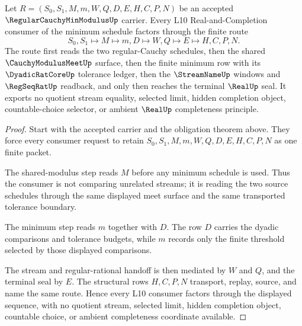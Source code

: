 \begin{theorem}\label{thm:regular-cauchy-min-modulus-l10-route}
Let $R=(S_0,S_1,M,m,W,Q,D,E,H,C,P,N)$ be an accepted $\RegularCauchyMinModulusUp$ carrier. Every L10 Real-and-Completion consumer of the minimum schedule factors through the finite route
$$
S_0,S_1 \longmapsto M \longmapsto m,D \longmapsto W,Q \longmapsto E \longmapsto H,C,P,N .
$$
The route first reads the two regular-Cauchy schedules, then the shared $\CauchyModulusMeetUp$ surface, then the finite minimum row with its $\DyadicRatCoreUp$ tolerance ledger, then the $\StreamNameUp$ windows and $\RegSeqRatUp$ readback, and only then reaches the terminal $\RealUp$ seal. It exports no quotient stream equality, selected limit, hidden completion object, countable-choice selector, or ambient $\RealUp$ completeness principle.
\end{theorem}
\begin{proof}
Start with the accepted carrier and the obligation theorem above. They force every consumer request to retain $S_0,S_1,M,m,W,Q,D,E,H,C,P,N$ as one finite packet.

The shared-modulus step reads $M$ before any minimum schedule is used. Thus the consumer is not comparing unrelated streams; it is reading the two source schedules through the same displayed meet surface and the same transported tolerance boundary.

The minimum step reads $m$ together with $D$. The row $D$ carries the dyadic comparisons and tolerance budgets, while $m$ records only the finite threshold selected by those displayed comparisons.

The stream and regular-rational handoff is then mediated by $W$ and $Q$, and the terminal seal by $E$. The structural rows $H,C,P,N$ transport, replay, source, and name the same route. Hence every L10 consumer factors through the displayed sequence, with no quotient stream, selected limit, hidden completion object, countable choice, or ambient completeness coordinate available.
\end{proof}

